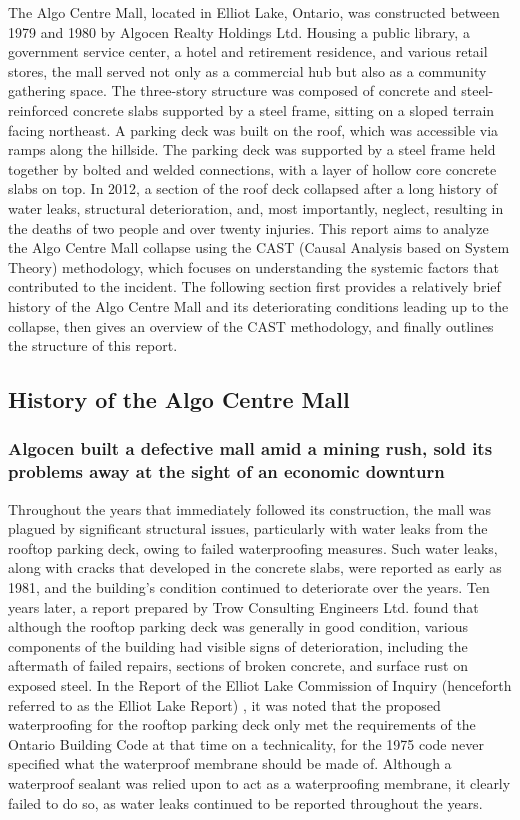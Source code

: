 \documentclass[12pt]{article}
\begin{document}
The Algo Centre Mall, located in Elliot Lake, Ontario, was constructed between 1979 and 1980 by Algocen Realty Holdings Ltd. Housing a public library, a government service center, a hotel and retirement residence, and various retail stores, the mall served not only as a commercial hub but also as a community gathering space. The three-story structure was composed of concrete and steel-reinforced concrete slabs supported by a steel frame, sitting on a sloped terrain facing northeast. A parking deck was built on the roof, which was accessible via ramps along the hillside. The parking deck was supported by a steel frame held together by bolted and welded connections, with a layer of hollow core concrete slabs on top. In 2012, a section of the roof deck collapsed after a long history of water leaks, structural deterioration, and, most importantly, neglect, resulting in the deaths of two people and over twenty injuries. This report aims to analyze the Algo Centre Mall collapse using the CAST (Causal Analysis based on System Theory) methodology, which focuses on understanding the systemic factors that contributed to the incident. The following section first provides a relatively brief history of the Algo Centre Mall and its deteriorating conditions leading up to the collapse, then gives an overview of the CAST methodology, and finally outlines the structure of this report.

\subsection{History of the Algo Centre Mall}

\subsubsection{Algocen built a defective mall amid a mining rush, sold its problems away at the sight of an economic downturn}

Throughout the years that immediately followed its construction, the mall was plagued by significant structural issues, particularly with water leaks from the rooftop parking deck, owing to failed waterproofing measures. Such water leaks, along with cracks that developed in the concrete slabs, were reported as early as 1981, and the building's condition continued to deteriorate over the years. Ten years later, a report prepared by Trow Consulting Engineers Ltd. found that although the rooftop parking deck was generally in good condition, various components of the building had visible signs of deterioration, including the aftermath of failed repairs, sections of broken concrete, and surface rust on exposed steel. In the Report of the Elliot Lake Commission of Inquiry (henceforth referred to as the Elliot Lake Report) \cite{AlgoLakeReport1}, it was noted that the proposed waterproofing for the rooftop parking deck only met the requirements of the Ontario Building Code at that time on a technicality, for the 1975 code never specified what the waterproof membrane should be made of. Although a waterproof sealant was relied upon to act as a waterproofing membrane, it clearly failed to do so, as water leaks continued to be reported throughout the years. 
\end{document}
